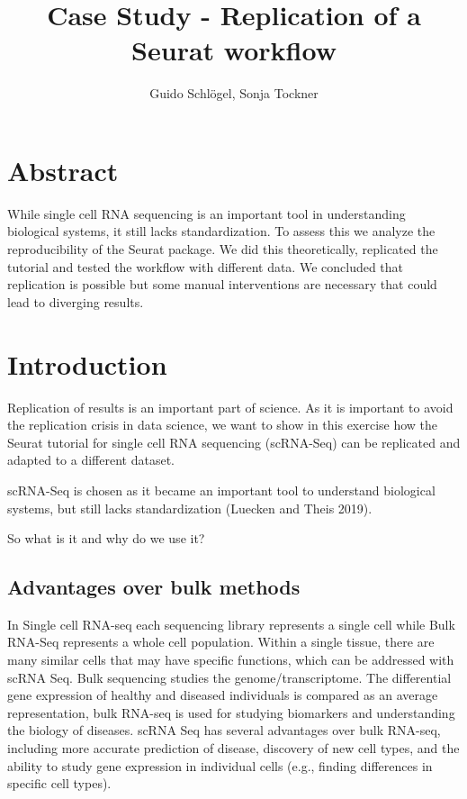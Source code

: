 \documentclass[a4paper, 10pt]{scrartcl}
\title{Case Study - Replication of a Seurat
workflow}
\author{Guido Schlögel, Sonja Tockner}
\begin{document}
\maketitle

\hypertarget{abstract}{%
\section*{Abstract}\label{abstract}}

While single cell RNA sequencing is an important tool in understanding
biological systems, it still lacks standardization. To assess this we
analyze the reproducibility of the Seurat package. We did this
theoretically, replicated the tutorial and tested the workflow with
different data. We concluded that replication is possible but some
manual interventions are necessary that could lead to diverging results.

\hypertarget{introduction}{%
\section{Introduction}\label{introduction}}

Replication of results is an important part of science. As it is
important to avoid the replication crisis in data science, we want to
show in this exercise how the Seurat tutorial for single cell RNA
sequencing (scRNA-Seq) can be replicated and adapted to a different
dataset.

scRNA-Seq is chosen as it became an important tool to understand
biological systems, but still lacks standardization (Luecken and Theis
2019).

So what is it and why do we use it?

\hypertarget{advantages-over-bulk-methods}{%
\subsection{Advantages over bulk
methods}\label{advantages-over-bulk-methods}}

In Single cell RNA-seq each sequencing library represents a single cell
while Bulk RNA-Seq represents a whole cell population. Within a single
tissue, there are many similar cells that may have specific functions,
which can be addressed with scRNA Seq. Bulk sequencing studies the
genome/transcriptome. The differential gene expression of healthy and
diseased individuals is compared as an average representation, bulk
RNA-seq is used for studying biomarkers and understanding the biology of
diseases. scRNA Seq has several advantages over bulk RNA-seq, including
more accurate prediction of disease, discovery of new cell types, and
the ability to study gene expression in individual cells (e.g., finding
differences in specific cell types).
\end{document}

